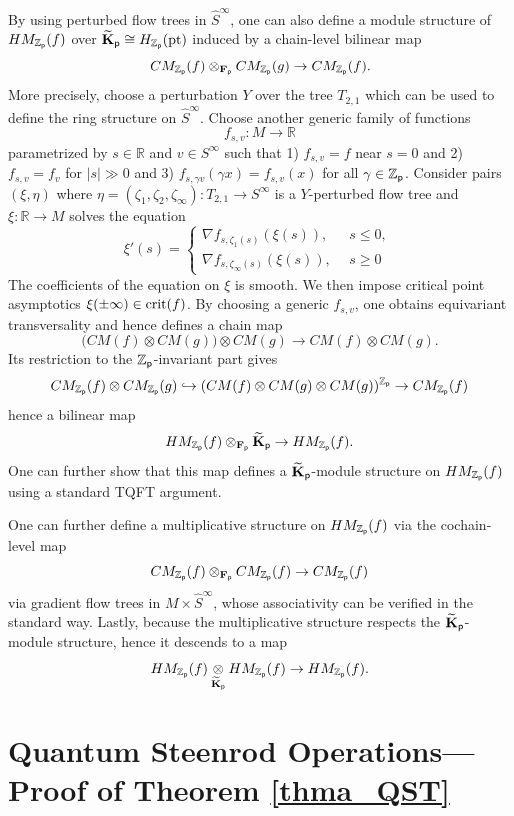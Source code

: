 \documentclass[reqno, 10pt]{amsart}
\numberwithin{equation}{section}
\numberwithin{equation}{section}
\theoremstyle{definition}
\theoremstyle{remark}
\newcommand{\beqn}{\begin{equation*}}
\newcommand{\eeqn}{\end{equation*}}
\newcommand{\mb}{\mathbb}
\newcommand{\fp}{{\bf F}_{\sf p}}
\newcommand{\tkp}{\wt{\bf K}_{\sf p}}
\newcommand{\zp}{{{\mb Z}_{\sf p}}}
\newcommand{\wt}{\widetilde}
\newcommand{\wh}{\widehat}
\begin{document}
By using perturbed flow trees in $\wh S^\infty$, one can also define a module structure of $HM_{\zp}(f)$ over $\tkp \cong H_{\zp}({\rm pt})$ induced by a chain-level bilinear map
\beqn
CM_{\zp} (f) \otimes_{\fp} CM _{\zp} (g) \to CM_{\zp}(f).
\eeqn
More precisely, choose a perturbation $Y$ over the tree $T_{2,1}$ which can be used to define the ring structure on $\wh S^\infty$. Choose another generic family of functions 
\beqn
f_{s, v}: M \to {\mb R}
\eeqn
parametrized by $s \in {\mb R}$ and $v \in S^\infty$ such that 1) $f_{s, v} = f$ near $s = 0$ and 2) $f_{s, v} = f_v$ for $|s|\gg 0$ and 3) $f_{s, \gamma v} (\gamma x) = f_{s, v}(x)$ for all $\gamma \in \zp$. Consider pairs $(\xi, \eta)$ where $\eta = (\zeta_1, \zeta_2, \zeta_\infty): T_{2,1} \to S^\infty$ is a $Y$-perturbed flow tree and $\xi: {\mb R} \to M $ solves the equation 
\beqn
\xi'(s) = \left\{ \begin{array}{cc}  \nabla f_{s, \zeta_1(s)}(\xi(s)),\ &\ s \leq 0,\ \\
 \nabla f_{s, \zeta_\infty(s)}(\xi(s)),\ &\ s \geq 0 \end{array}  \right.
\eeqn
The coefficients of the equation on $\xi$ is smooth. We then impose critical point asymptotics $\xi(\pm \infty) \in {\rm crit}(f)$. By choosing a generic $f_{s, v}$, one obtains equivariant transversality and hence defines a chain map
\beqn
\big( CM(f) \otimes CM(g) \big) \otimes CM(g) \to CM(f) \otimes CM(g).
\eeqn
Its restriction to the $\zp$-invariant part gives
\beqn
CM_{\zp}(f) \otimes CM_{\zp}(g) \hookrightarrow (CM(f) \otimes CM(g) \otimes CM(g))^{\zp} \to CM_{\zp}(f)
\eeqn
hence a bilinear map
\beqn
HM_{\zp}(f) \otimes_{\fp} \tkp \to HM_{\zp}(f).
\eeqn
One can further show that this map defines a $\tkp$-module structure on $HM_{\zp}(f)$ using a standard TQFT argument.





One can further define a multiplicative structure on $HM_{\zp}(f)$ via the cochain-level map
\beqn
CM_{\zp} (f) \otimes_{\fp} CM_{\zp}(f) \to CM_{\zp}(f)
\eeqn
via gradient flow trees in $M \times \wh S^\infty$, whose associativity can be verified in the standard way. Lastly, because the multiplicative structure respects the $\tkp$-module structure, hence it descends to a map
\beqn
HM_{\zp}(f) \underset{\tkp}{\otimes} HM_{\zp}(f) \to HM_{\zp}(f).
\eeqn


\section{Quantum Steenrod Operations---Proof of Theorem \ref{thma_QST}}\label{section_Steenrod}
\end{document}
